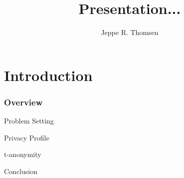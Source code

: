 \documentclass[t,mathserif]{beamer}
\title[Fall2010\hspace{18em}\insertframenumber/\inserttotalframenumber]{Presentation...}
\author[Jeppe R. Thomsen]{Jeppe R. Thomsen}%
\institute{Hong Kong Polytechnic University\\ Department of Computing}
\begin{document}
\begin{frame} %
\titlepage
\end{frame}

\section{Introduction} %

\begin{frame}[red]
\frametitle{Overview}
\Large
Problem Setting

\vspace{1em}

Privacy Profile
\vspace{1em}

t-anonymity
\vspace{1em}

Conclusion

\end{frame}


%
%
%
%
\end{document}
